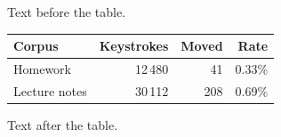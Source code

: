 \documentclass[12pt]{article}
\begin{document}
Text before the table.

\begin{tabular}{lrrr}\toprule Corpus & Keystrokes & Moved & Rate\\\midrule Homework & 12\,480 & 41 & 0.33\%\\Lecture notes & 30\,112 & 208 & 0.69\%\\\bottomrule\end{tabular}

Text after the table.
\end{document}
